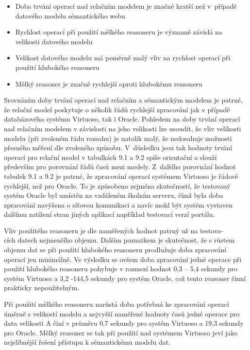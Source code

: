 \documentclass{projekt}
\begin{document}
\begin{itemize}
\item Doba trvání operací nad relačním modelem je značně kratší než v~případě datového modelu sémantického webu
\item Rychlost operací při použití mělkého reasoneru je významě závislá na velikosti datového modelu
\item Velikost datového modelu má poměrně malý vliv na rychlost operací při použití hlubokého reasoneru
\item Mělký reasoner je značně rychlejší oproti hlubokému reasoneru
\end{itemize}


Srovnáním doby trvání operací nad relačním a sémantickým modelem je patrné, že relační model poskytuje o několik řádů rychlejší zpracování jak v případě databázového systému Virtuoso, tak i Oracle. Pohledem na doby trvání operací nad relačním modelem v závislosti na jeho velikosti lze usoudit, že vliv velikosti modelu (při zvoleném řádu rozsahu) je natolik malý, že nedosahuje možnosti přesného měření dle zvoleného způsobu. V~důsledku jsou tak hodnoty trvání operací pro relační model v tabulkách 9.1 a 9.2 spíše orientační a slouží především pro porovnání řádů časů mezi modely. Z~dalšího porovnání hodnot tabulek 9.1 a 9.2 je patrné, že zpracování operací systémem Virtuoso je řádově rychlejší, než pro Oracle. To je způsobeno zejména skutečností, že testovaný systém Oracle byl umístěn na vzdáleném školním serveru, čímž byla doba zpracování navýšena o síťovou komunikaci a navíc mohl být systém vystaven dalšímu zatížení stran jiných aplikací například testovací verzí portálu.

Vliv použitého reasoneru je dle naměřených hodnot patrný už na testova-\\cích datech nejmenšího objemu. Dalším poznatkem je skutečnost, že s růstem objemu dat se při použití hlubokého reasoneru prodlužuje doba zpracování operací jen minimálně. Ve výsledku se ovšem doba zpracování jedné operace při použití hlubokého reasoneru pohybuje v rozmezí hodnot 0,3 – 5,4 sekundy pro systém Virtuoso a 3,2 -144,5 sekundy pro systém Oracle, což tento reasoner činní prakticky nepoužitelným. 

Při použití mělkého reasoneru narůstá doba potřebná ke zpracování operací úměrně s velikostí modelu a nejvyšší naměřené hodnoty časů jedné operace pro data velikosti A činí v průměru 0,7 sekundy pro systém Virtuoso a 19,3 sekundy pro Oracle. Mělký reasoner se tak při použití nad systémem Virtuoso jeví jako nejslibnější řešení přístupu k sémantickému modelu dat. 
\end{document}
